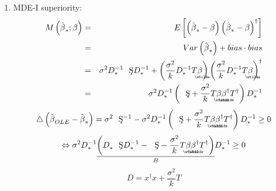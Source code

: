 \documentclass{article}
\begin{document}
\begin{enumerate}
\item MDE-I superiority:%
\begin{eqnarray*}
M\left( \hat{\beta}_{\ast };\beta \right)  &=&E\left[ \left( \hat{\beta}%
_{\ast }-\beta \right) \left( \hat{\beta}_{\ast }-\beta \right) ^{\dagger }%
\right]  \\
&=&Var\left( \hat{\beta}_{\ast }\right) +bias\cdot bias \\
&=&\sigma ^{2}D_{\ast }^{-1}\text{\c{S}}D_{\ast }^{-1}+\left( \frac{\sigma
^{2}}{k}D_{\ast }^{-1}T%
\underaccent{\wtilde}{\beta}%
\right) \left( \frac{\sigma ^{2}}{k}D_{\ast }^{-1}T%
\underaccent{\wtilde}{\beta}%
\right) ^{\dagger } \\
&=&\sigma ^{2}D_{\ast }^{-1}\left( \text{\c{S}}+\frac{\sigma ^{2}}{k}T%
\underaccent{\wtilde}{\beta}%
\underaccent{\wtilde}{\beta}%
^{\dagger }T^{\dagger }\right) D_{\ast }^{-1}
\end{eqnarray*}%
\begin{equation*}
\bigtriangleup \left( \hat{\beta}_{OLE}-\hat{\beta}_{\ast }\right) =\sigma
^{2}\text{\c{S}}^{-1}-\sigma ^{2}D_{\ast }^{-1}\left( \text{\c{S}}+\frac{%
\sigma ^{2}}{k}T%
\underaccent{\wtilde}{\beta}%
\underaccent{\wtilde}{\beta}%
^{\dagger }T^{\dagger }\right) D_{\ast }^{-1}\geq 0
\end{equation*}%
\begin{equation*}
\Leftrightarrow \sigma ^{2}D_{\ast }^{-1}\underset{B}{\underline{\left(
D_{\ast }^{{}}\text{\c{S}}D_{\ast }^{-1}-\text{\c{S}}-\frac{\sigma ^{2}}{k}T%
\underaccent{\wtilde}{\beta}%
\underaccent{\wtilde}{\beta}%
^{\dagger }T^{\dagger }\right) }}D_{\ast }^{-1}\geq 0
\end{equation*}%
\begin{equation*}
D=x^{\dagger }x+\frac{\sigma ^{2}}{k}T

\end{equation*}
\end{enumerate}
\end{document}
